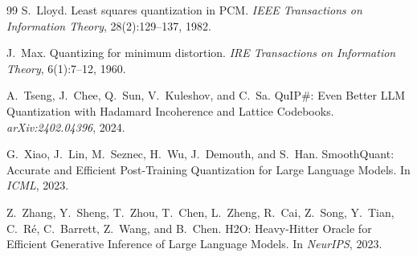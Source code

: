 \documentclass{article}
\begin{document}
\begin{thebibliography}{99}
S.~Lloyd.
\newblock Least squares quantization in PCM.
\newblock \textit{IEEE Transactions on Information Theory}, 28(2):129--137, 1982.

J.~Max.
\newblock Quantizing for minimum distortion.
\newblock \textit{IRE Transactions on Information Theory}, 6(1):7--12, 1960.

A.~Tseng, J.~Chee, Q.~Sun, V.~Kuleshov, and C.~Sa.
\newblock QuIP\#: Even Better LLM Quantization with Hadamard Incoherence and Lattice Codebooks.
\newblock \textit{arXiv:2402.04396}, 2024.

G.~Xiao, J.~Lin, M.~Seznec, H.~Wu, J.~Demouth, and S.~Han.
\newblock SmoothQuant: Accurate and Efficient Post-Training Quantization for Large Language Models.
\newblock In \textit{ICML}, 2023.

Z.~Zhang, Y.~Sheng, T.~Zhou, T.~Chen, L.~Zheng, R.~Cai, Z.~Song, Y.~Tian, C.~R{\'e}, C.~Barrett, Z.~Wang, and B.~Chen.
\newblock H2O: Heavy-Hitter Oracle for Efficient Generative Inference of Large Language Models.
\newblock In \textit{NeurIPS}, 2023.

\end{thebibliography}
\end{document}
